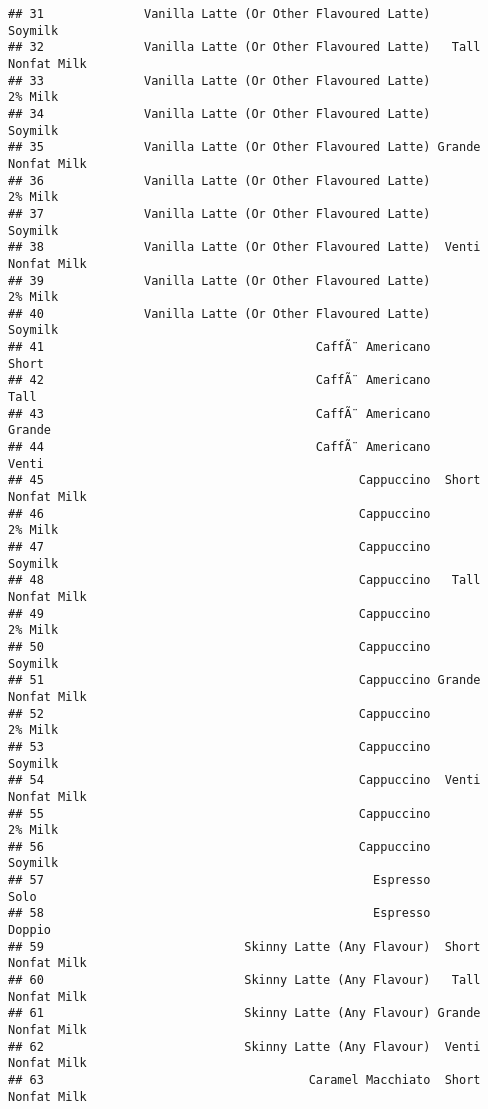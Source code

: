 \documentclass[
]{article}
\begin{document}
\begin{verbatim}
## 31              Vanilla Latte (Or Other Flavoured Latte)            Soymilk
## 32              Vanilla Latte (Or Other Flavoured Latte)   Tall Nonfat Milk
## 33              Vanilla Latte (Or Other Flavoured Latte)            2% Milk
## 34              Vanilla Latte (Or Other Flavoured Latte)            Soymilk
## 35              Vanilla Latte (Or Other Flavoured Latte) Grande Nonfat Milk
## 36              Vanilla Latte (Or Other Flavoured Latte)            2% Milk
## 37              Vanilla Latte (Or Other Flavoured Latte)            Soymilk
## 38              Vanilla Latte (Or Other Flavoured Latte)  Venti Nonfat Milk
## 39              Vanilla Latte (Or Other Flavoured Latte)            2% Milk
## 40              Vanilla Latte (Or Other Flavoured Latte)            Soymilk
## 41                                      CaffÃ¨ Americano              Short
## 42                                      CaffÃ¨ Americano               Tall
## 43                                      CaffÃ¨ Americano             Grande
## 44                                      CaffÃ¨ Americano              Venti
## 45                                            Cappuccino  Short Nonfat Milk
## 46                                            Cappuccino            2% Milk
## 47                                            Cappuccino            Soymilk
## 48                                            Cappuccino   Tall Nonfat Milk
## 49                                            Cappuccino            2% Milk
## 50                                            Cappuccino            Soymilk
## 51                                            Cappuccino Grande Nonfat Milk
## 52                                            Cappuccino            2% Milk
## 53                                            Cappuccino            Soymilk
## 54                                            Cappuccino  Venti Nonfat Milk
## 55                                            Cappuccino            2% Milk
## 56                                            Cappuccino            Soymilk
## 57                                              Espresso               Solo
## 58                                              Espresso             Doppio
## 59                            Skinny Latte (Any Flavour)  Short Nonfat Milk
## 60                            Skinny Latte (Any Flavour)   Tall Nonfat Milk
## 61                            Skinny Latte (Any Flavour) Grande Nonfat Milk
## 62                            Skinny Latte (Any Flavour)  Venti Nonfat Milk
## 63                                     Caramel Macchiato  Short Nonfat Milk

\end{verbatim}
\end{document}
